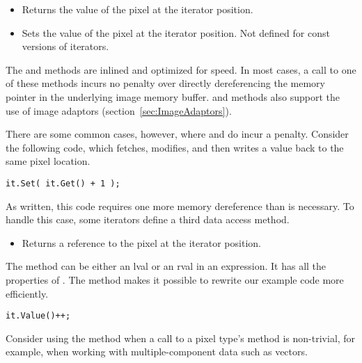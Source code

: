 \begin{itemize}
\item \textbf{} Returns the value of the pixel at the
iterator position.

\item \textbf{} Sets the value of the pixel at the
iterator position.  Not defined for const versions of iterators.
\end{itemize}

The  and  methods are inlined and optimized for speed. In
most cases, a call to one of these methods incurs no penalty over directly
dereferencing the memory pointer in the underlying image memory buffer.
 and  methods also support the use of image adaptors
(section~\ref{sec:ImageAdaptors}).

There are some common cases, however, where  and  do incur a
penalty. Consider the following code, which fetches, modifies, and then writes
a value back to the same pixel location.

\small
\begin{verbatim}
it.Set( it.Get() + 1 );
\end{verbatim}
\normalsize

As written, this code requires one more memory dereference than is necessary.  To
handle this case, some iterators define a third data access method.

\begin{itemize}
\item \textbf{} Returns a reference to the pixel at
the iterator position.
\end{itemize}

The  method can be either an lval or an rval in an expression.  It
has all the properties of .  The  method makes it
possible to rewrite our example code more efficiently.

\small
\begin{verbatim}
it.Value()++;
\end{verbatim}
\normalsize

Consider using the  method when a call to a pixel type's
 method is non-trivial, for example, when working
with multiple-component data such as vectors.

